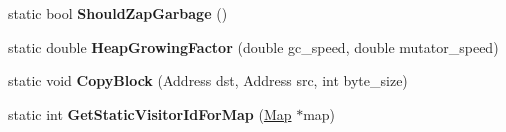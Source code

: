\begin{DoxyCompactItemize}
\item 
static bool {\bfseries Should\+Zap\+Garbage} ()\hypertarget{classv8_1_1internal_1_1_heap_ac19479ef877d178e26d2f34f56cda336}{}\label{classv8_1_1internal_1_1_heap_ac19479ef877d178e26d2f34f56cda336}

\item 
static double {\bfseries Heap\+Growing\+Factor} (double gc\+\_\+speed, double mutator\+\_\+speed)\hypertarget{classv8_1_1internal_1_1_heap_ac387345de000ea8d711eb24a61d346fa}{}\label{classv8_1_1internal_1_1_heap_ac387345de000ea8d711eb24a61d346fa}

\item 
static void {\bfseries Copy\+Block} (Address dst, Address src, int byte\+\_\+size)\hypertarget{classv8_1_1internal_1_1_heap_ac3641a0b7518d1536161ebcb69bc4be9}{}\label{classv8_1_1internal_1_1_heap_ac3641a0b7518d1536161ebcb69bc4be9}

\item 
static int {\bfseries Get\+Static\+Visitor\+Id\+For\+Map} (\hyperlink{classv8_1_1internal_1_1_map}{Map} $\ast$map)\hypertarget{classv8_1_1internal_1_1_heap_a5fba8e8204d1da859b066b150455e5c3}{}\label{classv8_1_1internal_1_1_heap_a5fba8e8204d1da859b066b150455e5c3}

\end{DoxyCompactItemize}
